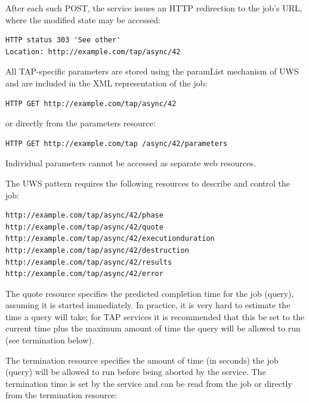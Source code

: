\documentclass[11pt,a4paper]{ivoa}
\begin{document}
{After each such POST, the service issues an HTTP redirection to the job's URL, 
where the modified state may be accessed:

\begin{verbatim}
HTTP status 303 'See other'
Location: http://example.com/tap/async/42
\end{verbatim}

All TAP-specific parameters are stored using the paramList mechanism of UWS and 
are included in the XML representation of the job:
\begin{verbatim}
HTTP GET http://example.com/tap/async/42
\end{verbatim}
or directly from the parameters resource:
\begin{verbatim}
HTTP GET http://example.com/tap /async/42/parameters
\end{verbatim}
Individual parameters cannot be accessed as separate web resources.

The UWS pattern requires the following resources to describe and control the 
job:
\begin{verbatim}
http://example.com/tap/async/42/phase
http://example.com/tap/async/42/quote
http://example.com/tap/async/42/executionduration
http://example.com/tap/async/42/destruction
http://example.com/tap/async/42/results
http://example.com/tap/async/42/error
\end{verbatim}
The quote resource specifies the predicted completion time for the job (query), 
assuming it is started immediately. In practice, it is very hard to estimate the 
time a query will take; for TAP services it is recommended that this be set to 
the current time plus the maximum amount of time the query will be allowed to 
run (see termination below). 

The termination resource specifies the amount of time (in seconds) the job 
(query) will be allowed to run before being aborted by the service. The 
termination time is set by the service and can be read from the job or directly 
from the termination resource:

}
\end{document}
